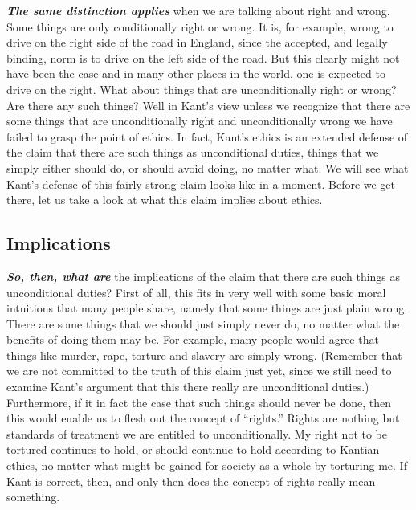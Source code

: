 \documentclass[
  12pt, openany]{book}
\begin{document}
\textbf{\emph{The same distinction applies}} when we are talking about right and wrong. Some things are only conditionally right or wrong. It is, for example, wrong to drive on the right side of the road in England, since the accepted, and legally binding, norm is to drive on the left side of the road. But this clearly might not have been the case and in many other places in the world, one is expected to drive on the right. What about things that are unconditionally right or wrong? Are there any such things? Well in Kant's view unless we recognize that there are some things that are unconditionally right and unconditionally wrong we have failed to grasp the point of ethics. In fact, Kant's ethics is an extended defense of the claim that there are such things as unconditional duties, things that we simply either should do, or should avoid doing, no matter what. We will see what Kant's defense of this fairly strong claim looks like in a moment. Before we get there, let us take a look at what this claim implies about ethics.

\hypertarget{implications}{%
\subsection*{Implications}\label{implications}}


\textbf{\emph{So, then, what are}} the implications of the claim that there are such things as unconditional duties? First of all, this fits in very well with some basic moral intuitions that many people share, namely that some things are just plain wrong. There are some things that we should just simply never do, no matter what the benefits of doing them may be. For example, many people would agree that things like murder, rape, torture and slavery are simply wrong. (Remember that we are not committed to the truth of this claim just yet, since we still need to examine Kant's argument that this there really are unconditional duties.) Furthermore, if it in fact the case that such things should never be done, then this would enable us to flesh out the concept of ``rights.'' Rights are nothing but standards of treatment we are entitled to unconditionally. My right not to be tortured continues to hold, or should continue to hold according to Kantian ethics, no matter what might be gained for society as a whole by torturing me. If Kant is correct, then, and only then does the concept of rights really mean something.
\end{document}
